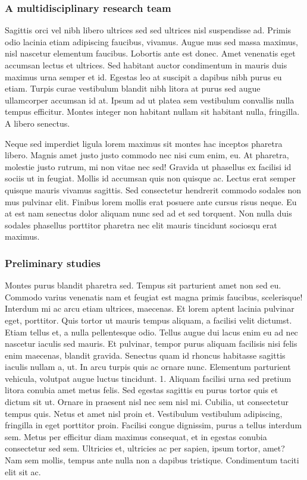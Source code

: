 \documentclass[11pt,]{article}
\begin{document}
\hypertarget{a-multidisciplinary-research-team}{%
\subsubsection{A multidisciplinary research
team}\label{a-multidisciplinary-research-team}}

Sagittis orci vel nibh libero ultrices sed sed ultrices nisl suspendisse
ad. Primis odio lacinia etiam adipiscing faucibus, vivamus. Augue mus
sed massa maximus, nisl nascetur elementum faucibus. Lobortis ante est
donec. Amet venenatis eget accumsan lectus et ultrices. Sed habitant
auctor condimentum in mauris duis maximus urna semper et id. Egestas leo
at suscipit a dapibus nibh purus eu etiam. Turpis curae vestibulum
blandit nibh litora at purus sed augue ullamcorper accumsan id at. Ipsum
ad ut platea sem vestibulum convallis nulla tempus efficitur. Montes
integer non habitant nullam sit habitant nulla, fringilla. A libero
senectus.

Neque sed imperdiet ligula lorem maximus sit montes hac inceptos
pharetra libero. Magnis amet justo justo commodo nec nisi cum enim, eu.
At pharetra, molestie justo rutrum, mi non vitae nec sed! Gravida ut
phasellus ex facilisi id sociis ut in feugiat. Mollis id accumsan quis
non quisque ac. Lectus erat semper quisque mauris vivamus sagittis. Sed
consectetur hendrerit commodo sodales non mus pulvinar elit. Finibus
lorem mollis erat posuere ante cursus risus neque. Eu at est nam
senectus dolor aliquam nunc sed ad et sed torquent. Non nulla duis
sodales phasellus porttitor pharetra nec elit mauris tincidunt sociosqu
erat maximus.

\hypertarget{preliminary-studies}{%
\subsubsection{Preliminary studies}\label{preliminary-studies}}

Montes purus blandit pharetra sed. Tempus sit parturient amet non sed
eu. Commodo varius venenatis nam et feugiat est magna primis faucibus,
scelerisque! Interdum mi ac arcu etiam ultrices, maecenas. Et lorem
aptent lacinia pulvinar eget, porttitor. Quis tortor ut mauris tempus
aliquam, a facilisi velit dictumst. Etiam tellus et, a nulla
pellentesque odio. Tellus augue dui lacus enim eu ad nec nascetur
iaculis sed mauris. Et pulvinar, tempor purus aliquam facilisis nisi
felis enim maecenas, blandit gravida. Senectus quam id rhoncus habitasse
sagittis iaculis nullam a, ut. In arcu turpis quis ac ornare nunc.
Elementum parturient vehicula, volutpat augue luctus tincidunt. 1.
Aliquam facilisi urna sed pretium litora conubia amet metus felis. Sed
egestas sagittis eu purus tortor quis et dictum sit ut. Ornare in
praesent nisl nec sem nisl mi. Cubilia, ut consectetur tempus quis.
Netus et amet nisl proin et. Vestibulum vestibulum adipiscing, fringilla
in eget porttitor proin. Facilisi congue dignissim, purus a tellus
interdum sem. Metus per efficitur diam maximus consequat, et in egestas
conubia consectetur sed sem. Ultricies et, ultricies ac per sapien,
ipsum tortor, amet? Nam sem mollis, tempus ante nulla non a dapibus
tristique. Condimentum taciti elit sit ac.
\end{document}
